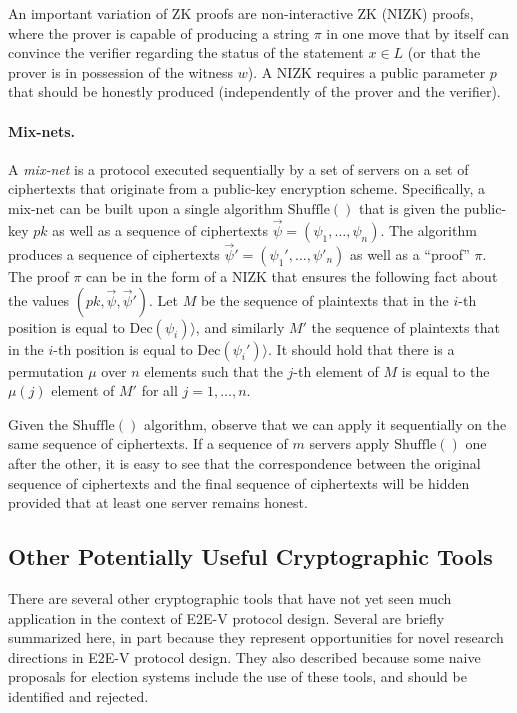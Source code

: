 An important variation of ZK proofs are non-interactive ZK (NIZK)
proofs, where the prover is capable of producing a string $\pi$ in one
move that by itself can convince the verifier regarding the status of
the statement $x\in L$ (or that the prover is in possession of the
witness $w$). A NIZK requires a public parameter $p$ that should be
honestly produced (independently of the prover and the verifier).

\paragraph{Mix-nets.} A \emph{mix-net} is a protocol executed
sequentially by a set of servers on a set of ciphertexts that
originate from a public-key encryption scheme. Specifically, a mix-net
can be built upon a single algorithm $\mathrm{Shuffle}()$ that is
given the public-key $pk$ as well as a sequence of ciphertexts
$\vec\psi = (\psi_1,\ldots, \psi_n)$. The algorithm produces a
sequence of ciphertexts $\vec\psi' = (\psi_1', \ldots, \psi'_n)$ as
well as a ``proof'' $\pi$. The proof $\pi$ can be in the form of a
NIZK that ensures the following fact about the values
$(pk, \vec \psi, \vec \psi')$. Let $M$ be the sequence of plaintexts
that in the $i$-th position is equal to
$ \mathrm{Dec}(\psi_i) \rangle$, and similarly $M'$ the sequence of
plaintexts that in the $i$-th position is equal to
$\mathrm{Dec}(\psi_i') \rangle$. It should hold that there is a
permutation $\mu$ over $n$ elements such that the $j$-th element of
$M$ is equal to the $\mu(j)$ element of $M'$ for all $j=1,\ldots, n$.

Given the $\mathrm{Shuffle}()$ algorithm, observe that we can apply it
sequentially on the same sequence of ciphertexts. If a sequence of $m$
servers apply $\mathrm{Shuffle}()$ one after the other, it is easy to
see that the correspondence between the original sequence of
ciphertexts and the final sequence of ciphertexts will be hidden
provided that at least one server remains honest.

\subsection{Other Potentially Useful Cryptographic Tools}

There are several other cryptographic tools that have not yet seen
much application in the context of E2E-V protocol design. Several are
briefly summarized here, in part because they represent opportunities
for novel research directions in E2E-V protocol design. They also
described because some naive proposals for election systems include
the use of these tools, and should be identified and rejected.

